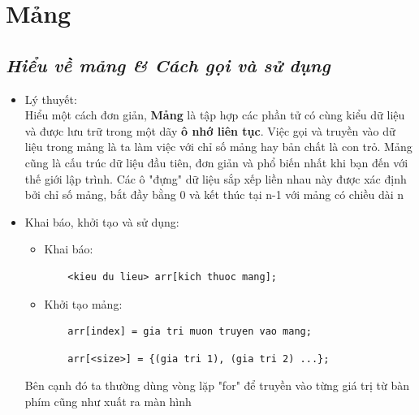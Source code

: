 \documentclass[12pt,a4paper]{article}
\begin{document}
\section{Mảng}
\begin{center}
	\subsection*{\textbf{\textit{Hiểu về mảng \& Cách gọi và sử dụng}}}
\end{center}
\begin{itemize}
	\item Lý thuyết:\\
Hiểu một cách đơn giản, \textbf{Mảng} là tập hợp các phần tử có cùng kiểu dữ liệu và được lưu trữ trong một dãy \textbf{ô nhớ liên tục}. Việc gọi và truyền vào dữ liệu trong mảng là ta làm việc với chỉ số mảng hay bản chất là con trỏ. Mảng cũng là cấu trúc dữ liệu đầu tiên, đơn giản và phổ biến nhất khi bạn đến với thế giới lập trình. Các ô "đựng" dữ liệu sắp xếp liền nhau này được xác định bởi chỉ số mảng, bắt đầy bằng 0 và kết thúc tại n-1 với mảng có chiều dài n 
	\item Khai báo, khởi tạo và sử dụng:\\
\begin{itemize}
	\item Khai báo:
\begin{lstlisting}
	<kieu du lieu> arr[kich thuoc mang];
\end{lstlisting}
	\item Khởi tạo mảng: 
\begin{lstlisting}
	arr[index] = gia tri muon truyen vao mang;
\end{lstlisting}
\begin{lstlisting}
	arr[<size>] = {(gia tri 1), (gia tri 2) ...};
\end{lstlisting}
\end{itemize}
Bên cạnh đó ta thường dùng vòng lặp "for" để truyền vào từng giá trị từ bàn phím cũng như xuất ra màn hình
\end{itemize}
 
\end{document}
